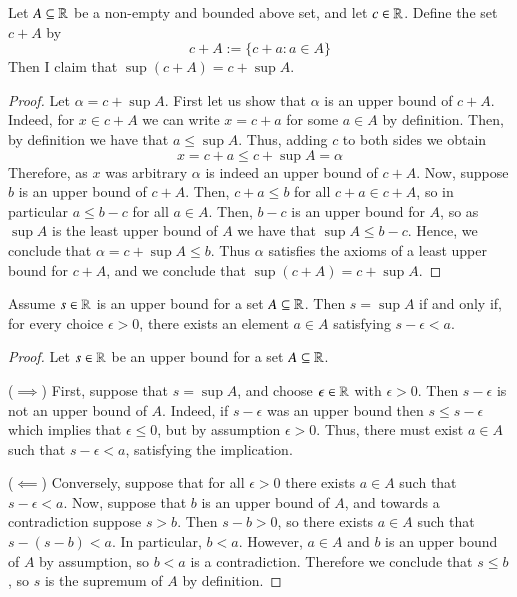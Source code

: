 \begin{eg}
    Let $A \subseteq \mathbb R$ be a non-empty and bounded above set, and let $c \in \mathbb R$. Define the set $c+A$ by $$c+A:=\{c+a:a \in A\}$$ Then I claim that $\sup(c+A) = c+\sup A$.
    \begin{proof}
        Let $\alpha = c+\sup A$. First let us show that $\alpha$ is an upper bound of $c+A$. Indeed, for $x \in c+A$ we can write $x = c+a$ for some $a \in A$ by definition. Then, by definition we have that $a \leq \sup A$. Thus, adding $c$ to both sides we obtain $$x = c+a \leq c+\sup A = \alpha$$
        Therefore, as $x$ was arbitrary $\alpha$ is indeed an upper bound of $c+A$. Now, suppose $b$ is an upper bound of $c+A$. Then, $c+a \leq b$ for all $c+a \in c+ A$, so in particular $a \leq b - c$ for all $a \in A$. Then, $b-c$ is an upper bound for $A$, so as $\sup A$ is the least upper bound of $A$ we have that $\sup A \leq b-c$. Hence, we conclude that $\alpha = c+\sup A \leq b$. Thus $\alpha$ satisfies the axioms of a least upper bound for $c+A$, and we conclude that $\sup(c+A) = c+\sup A$.
    \end{proof}
\end{eg}


\begin{lem}
    Assume $s \in \mathbb R$ is an upper bound for a set $A \subseteq \mathbb R$. Then $s = \sup A$ if and only if, for every choice $\epsilon > 0$, there exists an element $a \in A$ satisfying $s-\epsilon < a$.
\end{lem}
\begin{proof}
    Let $s \in \mathbb R$ be an upper bound for a set $A \subseteq \mathbb R$. 

    ($\implies$) First, suppose that $s = \sup A$, and choose $\epsilon \in \mathbb R$ with $\epsilon > 0$. Then $s-\epsilon$ is not an upper bound of $A$. Indeed, if $s-\epsilon$ was an upper bound then $s \leq s - \epsilon$ which implies that $\epsilon \leq 0$, but by assumption $\epsilon > 0$. Thus, there must exist $a \in A$ such that $s - \epsilon < a$, satisfying the implication.

    ($\impliedby$) Conversely, suppose that for all $\epsilon > 0$ there exists $a \in A$ such that $s - \epsilon < a$. Now, suppose that $b$ is an upper bound of $A$, and towards a contradiction suppose $s > b$. Then $s - b > 0$, so there exists $a \in A$ such that $s - (s-b) < a$. In particular, $b < a$. However, $a \in A$ and $b$ is an upper bound of $A$ by assumption, so $b < a$ is a contradiction. Therefore we conclude that $s \leq b$, so $s$ is the supremum of $A$ by definition.
\end{proof}


